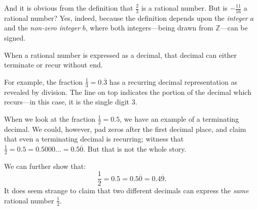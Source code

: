 \documentclass[
  a4paper,
]{article}
\begin{document}
And it is obvious from the definition that \(\frac{2}{3}\) is a rational
number. But is \(-\frac{11}{16}\) a rational number? Yes, indeed,
because the definition depends upon the \emph{integer} \(a\) and the
\emph{non-zero integer} \(b\), where both integers---being drawn from
\(\mathbb{Z}\)---can be signed.

When a rational number is expressed as a decimal, that decimal can
either terminate or recur without end.

For example, the fraction \(\frac{1}{3} = 0.\overline{3}\) has a
recurring decimal representation as revealed by division. The line on
top indicates the portion of the decimal which recurs---in this case, it
is the single digit \(3\).

When we look at the fraction \(\frac{1}{2} = 0.5\), we have an example
of a terminating decimal. We could, however, pad zeros after the first
decimal place, and claim that even a terminating decimal is recurring;
witness that \(\frac{1}{2} = 0.5 = 0.5000 \dots = 0.5\overline{0}\). But
that is not the whole story.

We can further show that: \[
\frac{1}{2} = 0.5 = 0.5\overline{0} = 0.4\overline{9}.
\] It does seem strange to claim that two different decimals can express
the \emph{same} rational number \(\frac{1}{2}\).
\end{document}
